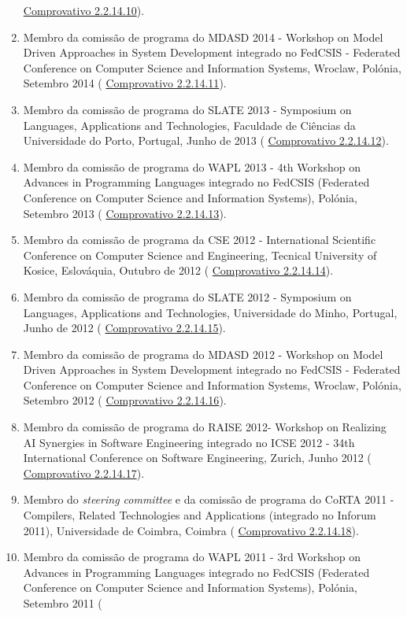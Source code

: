 \documentclass[11pt]{article}
\begin{document}
\begin{enumerate}
{\href{run:ComprovativosCOCP/CPQuatic2014.pdf}{Comprovativo 2.2.14.10}).}
\item{Membro da comissão de programa do MDASD 2014 - Workshop on Model Driven Approaches in System Development integrado no FedCSIS - Federated Conference on Computer Science and Information Systems, Wroclaw, Polónia, Setembro 2014 (
\href{run:ComprovativosCOCP/CPMDASD2014.pdf}{Comprovativo 2.2.14.11}).}
\item{Membro da comissão de programa do SLATE 2013 - Symposium on Languages, Applications and Technologies, Faculdade de Ciências da Universidade do Porto, Portugal, Junho de 2013 (
\href{run:ComprovativosCOCP/CPSLATE2013.pdf}{Comprovativo 2.2.14.12}).}
\item{Membro da comissão de programa do WAPL 2013 - 4th Workshop on Advances in Programming Languages integrado no FedCSIS (Federated Conference on Computer Science and Information Systems), Polónia, Setembro 2013 (
\href{run:ComprovativosCOCP/CPWAPL2013.pdf}{Comprovativo 2.2.14.13}).}
\item{Membro da comissão de programa da CSE 2012 - International Scientific Conference on Computer Science and Engineering, Tecnical University of Kosice, Eslováquia, Outubro de 2012 (
\href{run:ComprovativosCOCP/CPCSE2012.pdf}{Comprovativo 2.2.14.14}).}
\item{Membro da comissão de programa do SLATE 2012 - Symposium on Languages, Applications and Technologies, Universidade do Minho, Portugal, Junho de 2012 (
\href{run:ComprovativosCOCP/CPSLATE2012.pdf}{Comprovativo 2.2.14.15}).}
\item{Membro da comissão de programa  do MDASD 2012 - Workshop on Model Driven Approaches in System Development integrado no FedCSIS - Federated Conference on Computer Science and Information Systems, Wroclaw, Polónia, Setembro 2012 (
\href{run:ComprovativosCOCP/CPMDASD2012.pdf}{Comprovativo 2.2.14.16}).}
\item{Membro da comissão de programa do RAISE 2012- Workshop on Realizing AI Synergies in Software Engineering integrado no ICSE 2012 - 34th International Conference on Software Engineering, Zurich, Junho 2012 (
\href{run:ComprovativosCOCP/COCPRAISE2012.pdf}{Comprovativo 2.2.14.17}).}
\item{Membro do 
\emph{steering committee} e da comissão de programa do CoRTA 2011 - Compilers, Related Technologies and Applications (integrado no Inforum 2011), Universidade de Coimbra, Coimbra (
\href{run:ComprovativosCOCP/CPCoRTA2011.pdf}{Comprovativo 2.2.14.18}).}
\item{Membro da comissão de programa do WAPL 2011 - 3rd Workshop on Advances in Programming Languages integrado no FedCSIS (Federated Conference on Computer Science and Information Systems), Polónia, Setembro 2011 (
}
\end{enumerate}
\end{document}
